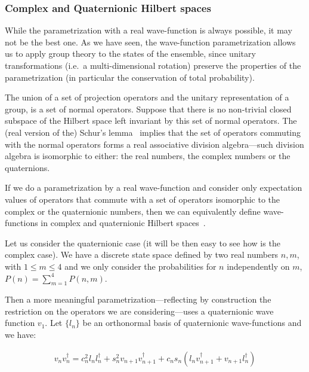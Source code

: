 \documentclass[11pt]{book}
\begin{document}
\hypertarget{sec:complex}{%
\subsubsection{Complex and Quaternionic Hilbert
spaces}\label{sec:complex}}

While the parametrization with a real wave-function is always possible,
it may not be the best one. As we have seen, the wave-function
parametrization allows us to apply group theory to the states of the
ensemble, since unitary transformations (i.e.~a multi-dimensional
rotation) preserve the properties of the parametrization (in particular
the conservation of total probability).

The union of a set of projection operators and the unitary
representation of a group, is a set of normal operators. Suppose that
there is no non-trivial closed subspace of the Hilbert space left
invariant by this set of normal operators. The (real version of the)
Schur's lemma~\cite{Pedro2013On}\cite{Moretti2016Quantum}\cite{Li2003Real} implies that the
set of operators commuting with the normal operators forms a real
associative division algebra---such division algebra is isomorphic to
either: the real numbers, the complex numbers or the quaternions.

If we do a parametrization by a real wave-function and consider only
expectation values of operators that commute with a set of operators
isomorphic to the complex or the quaternionic numbers, then we can
equivalently define wave-functions in complex and quaternionic Hilbert
spaces~\cite{Myrheim1999Quantum}\cite{Pedro2013On}\cite{Moretti2016Quantum}.

Let us consider the quaternionic case (it will be then easy to see how
is the complex case). We have a discrete state space defined by two real
numbers \(n,m\), with \(1\leq m\leq 4\) and we only consider the
probabilities for \(n\) independently on \(m\),
\(P(n)=\sum_{m=1}^4 P(n,m)\).

Then a more meaningful parametrization---reflecting by construction the
restriction on the operators we are considering---uses a quaternionic
wave function \(v_1\). Let \(\{l_n\}\) be an orthonormal basis of
quaternionic wave-functions and we have:

\begin{equation}\begin{aligned}
v_n v_n^\dagger=c_n^2 l_nl_n^\dagger+s_n^2 v_{n+1}v_{n+1}^\dagger+c_ns_n(l_n v_{n+1}^\dagger+v_{n+1} l_{n}^\dagger)\end{aligned}\end{equation}
\end{document}
